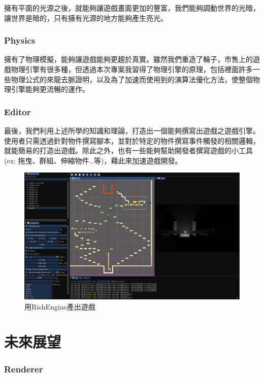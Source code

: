 擁有平面的光源之後，就能夠讓遊戲畫面更加的豐富，我們能夠調動世界的光暗，讓世界是暗的，只有擁有光源的地方能夠產生亮光。

\subsubsection{Physics}

擁有了物理模擬，能夠讓遊戲能夠更趨於真實。雖然我們重造了輪子，市售上的遊戲物理引擎有很多種，但透過本次專案我習得了物理引擎的原理，包括裡面許多一些物理公式的來龍去脈證明，以及為了加速而使用到的演算法優化方法，使整個物理引擎能夠更流暢的運作。

\subsubsection{Editor}
最後，我們利用上述所學的知識和理論，打造出一個能夠撰寫出遊戲之遊戲引擎。使用者只需透過針對物件撰寫腳本，並對於特定的物件撰寫事件觸發的相關邏輯，就能簡易的打造出遊戲。除此之外，也有一些能夠幫助開發者撰寫遊戲的小工具(ex: 拖曳、群組、伸縮物件…等)，藉此來加速遊戲開發。

\begin{figure}[h]
    \includegraphics[width=\linewidth]{./resources/gametest.jpg}
\caption{用RishEngine產出遊戲}
\label{fig:gametest} 
\end{figure}

\section{未來展望}

\subsubsection{Renderer}

